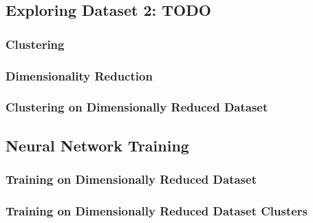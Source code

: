 \documentclass{sig-alternate}
\begin{document}

\subsection{Exploring Dataset 2: TODO}

\subsubsection{Clustering}


\subsubsection{Dimensionality Reduction}


\subsubsection{Clustering on Dimensionally Reduced Dataset}



\subsection{Neural Network Training}


\subsubsection{Training on Dimensionally Reduced Dataset}


\subsubsection{Training on Dimensionally Reduced Dataset Clusters}

\end{document}
